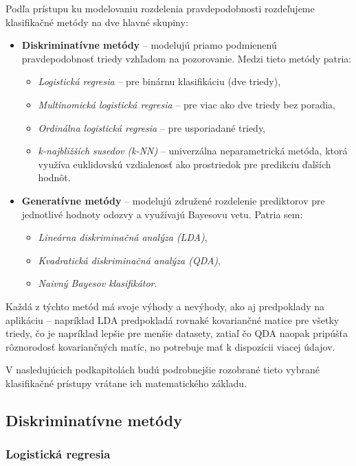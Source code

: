 Podľa prístupu ku modelovaniu rozdelenia pravdepodobnosti rozdeľujeme klasifikačné metódy na dve hlavné skupiny:

\begin{itemize}
  \item \textbf{Diskriminatívne metódy} – modelujú priamo podmienenú pravdepodobnosť triedy vzhľadom na pozorovanie. Medzi tieto metódy patria:
  \begin{itemize}
    \item \textit{Logistická regresia} – pre binárnu klasifikáciu (dve triedy),
    \item \textit{Multinomická logistická regresia} – pre viac ako dve triedy bez poradia,
    \item \textit{Ordinálna logistická regresia} – pre usporiadané triedy,
    \item \textit{k-najbližších susedov (k-NN)} – univerzálna neparametrická metóda, ktorá využíva euklidovskú vzdialenosť ako prostriedok pre predikciu ďalších hodnôt.
  \end{itemize}
  
  \item \textbf{Generatívne metódy} – modelujú združené rozdelenie prediktorov pre jednotlivé hodnoty odozvy a využívajú Bayesovu vetu. Patria sem:
  \begin{itemize}
    \item \textit{Lineárna diskriminačná analýza (LDA)},
    \item \textit{Kvadratická diskriminačná analýza (QDA)},
    \item \textit{Naivný Bayesov klasifikátor}.
  \end{itemize}
\end{itemize}

Každá z týchto metód má svoje výhody a nevýhody, ako aj predpoklady na aplikáciu – napríklad LDA predpokladá rovnaké kovariančné matice pre všetky triedy, čo je napríklad lepšie pre menšie datasety, zatiaľ čo QDA naopak pripúšťa rôznorodosť kovariančných matíc, no potrebuje mať k dispozícii viacej údajov.

V nasledujúcich podkapitolách budú podrobnejšie rozobrané tieto vybrané klasifikačné prístupy vrátane ich matematického základu.

\subsection{Diskriminatívne metódy}
\label{subsec:disc_methods}

\subsubsection{Logistická regresia}
\label{subsubsec:log_regression}

